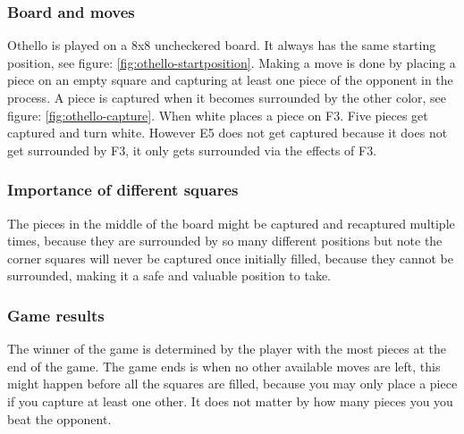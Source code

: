 \documentclass[10pt,letterpaper]{article}
\begin{document}
\subsubsection{Board and moves}
Othello is played on a 8x8 uncheckered board. It always has the same starting position, see figure: \ref{fig:othello-startposition}. Making a move is done by placing a piece on an empty square and capturing at least one piece of the opponent in the process. A piece is captured when it becomes surrounded by the other color, see figure: \ref{fig:othello-capture}. When white places a piece on F3. Five pieces get captured and turn white. However E5 does not get captured because it does not get surrounded by F3, it only gets surrounded via the effects of F3.
\subsubsection{Importance of different squares} The pieces in the middle of the board might be captured and recaptured multiple times, because they are surrounded by so many different positions but note the corner squares will never be captured once initially filled, because they cannot be surrounded, making it a safe and valuable position to take.
\subsubsection{Game results} The winner of the game is determined by the player with the most pieces at the end of the game. The game ends is when no other available moves are left, this might happen before all the squares are filled, because you may only place a piece if you capture at least one other. It does not matter by how many pieces you you beat the opponent.
\end{document}
